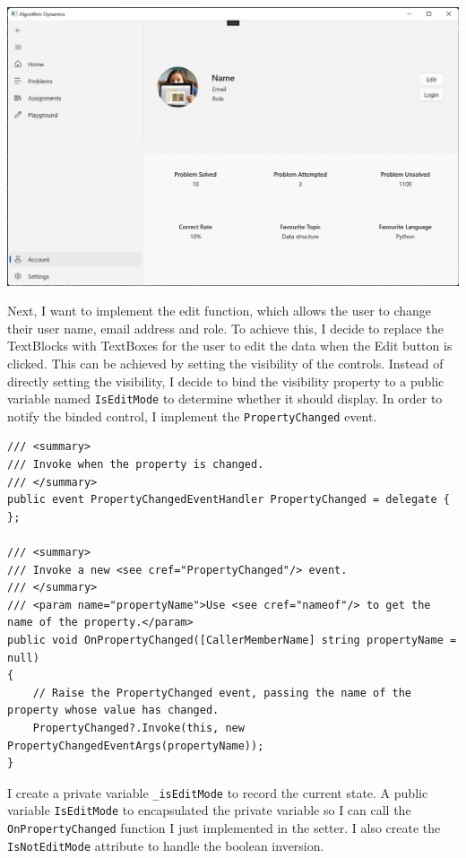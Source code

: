 \documentclass[a4paper]{report}
\newcommand{\code}{\texttt}
\begin{document}
\includegraphics[width=\textwidth, height=\textheight, keepaspectratio]{AccountPage-Layout}

Next, I want to implement the edit function, which allows the user to change their user name, email address and role. To achieve this, I decide to replace the TextBlocks with TextBoxes for the user to edit the data when the Edit button is clicked. This can be achieved by setting the visibility of the controls. Instead of directly setting the visibility, I decide to bind the visibility property to a public variable named \code{IsEditMode} to determine whether it should display. In order to notify the binded control, I implement the \code{PropertyChanged} event\cite{microsoft:docs:data-binding-in-depth}.

\begin{verbatim}
/// <summary>
/// Invoke when the property is changed.
/// </summary>
public event PropertyChangedEventHandler PropertyChanged = delegate { };

/// <summary>
/// Invoke a new <see cref="PropertyChanged"/> event.
/// </summary>
/// <param name="propertyName">Use <see cref="nameof"/> to get the name of the property.</param>
public void OnPropertyChanged([CallerMemberName] string propertyName = null)
{
    // Raise the PropertyChanged event, passing the name of the property whose value has changed.
    PropertyChanged?.Invoke(this, new PropertyChangedEventArgs(propertyName));
}
\end{verbatim}

I create a private variable \code{_isEditMode} to record the current state. A public variable \code{IsEditMode} to encapsulated the private variable so I can call the \code{OnPropertyChanged} function I just implemented in the setter. I also create the \code{IsNotEditMode} attribute to handle the boolean inversion.
\end{document}
